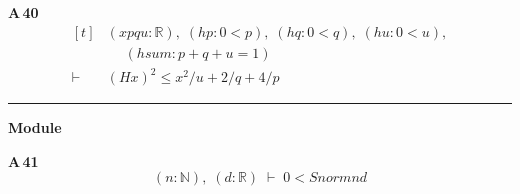 \noindent\textbf{A\,40}\quad{}
{\footnotesize\[ \begin{aligned}[t]
&(\mathit{x} \mathit{p} \mathit{q} \mathit{u} : \mathbb{R} ),\; (\mathit{hp} : 0<\mathit{p}),\; (\mathit{hq} : 0<\mathit{q}),\; (\mathit{hu} : 0<\mathit{u}),\\
&\quad \; (\mathit{hsum} : \mathit{p}+\mathit{q}+\mathit{u}=1)\\
\vdash\;&(\mathit{H} \mathit{x})^{2} \leq \mathit{x}^{2}/\mathit{u}+2/\mathit{q}+4/\mathit{p}
\end{aligned} \]}

\vspace{4pt}\noindent\rule{\columnwidth}{0.4pt}\par\vspace{2pt}
\noindent\textbf{Module }\par\vspace{3pt}

\noindent\textbf{A\,41}\quad{}
{\footnotesize\[ (\mathit{n} : \mathbb{N} ),\; (\mathit{d} : \mathbb{R} ) \;\vdash\; 0 < \mathit{Snorm} \mathit{n} \mathit{d} \]}

